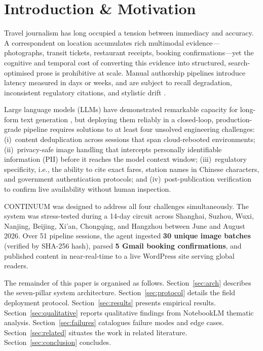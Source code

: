 \documentclass[conference]{IEEEtran}
\begin{document}
\section{Introduction \& Motivation}

Travel journalism has long occupied a tension between immediacy and accuracy.
A correspondent on location accumulates rich multimodal evidence---photographs,
transit tickets, restaurant receipts, booking confirmations---yet the cognitive
and temporal cost of converting this evidence into structured, search-optimised
prose is prohibitive at scale. Manual authorship pipelines introduce latency
measured in days or weeks, and are subject to recall degradation, inconsistent
regulatory citations, and stylistic drift \cite{Radford2019}.

Large language models (LLMs) have demonstrated remarkable capacity for long-form
text generation \cite{Brown2020}, but deploying them reliably in a closed-loop,
production-grade pipeline requires solutions to at least four unsolved engineering
challenges: (i)~content deduplication across sessions that span cloud-rebooted
environments; (ii)~privacy-safe image handling that intercepts personally
identifiable information (PII) before it reaches the model context window;
(iii)~regulatory specificity, i.e., the ability to cite exact fares, station
names in Chinese characters, and government authentication protocols; and
(iv)~post-publication verification to confirm live availability without
human inspection.

\textsc{CONTINUUM} was designed to address all four challenges simultaneously.
The system was stress-tested during a 14-day circuit across Shanghai,
Suzhou, Wuxi, Nanjing, Beijing, Xi'an, Chongqing, and Hangzhou between
June and August 2026. Over 51 pipeline sessions, the agent ingested
\textbf{30 unique image batches} (verified by SHA-256 hash), parsed
\textbf{5 Gmail booking confirmations}, and published content in near-real-time
to a live WordPress site serving global readers.

The remainder of this paper is organised as follows. Section~\ref{sec:arch}
describes the seven-pillar system architecture. Section~\ref{sec:protocol}
details the field deployment protocol. Section~\ref{sec:results} presents
empirical results. Section~\ref{sec:qualitative} reports qualitative findings
from NotebookLM thematic analysis. Section~\ref{sec:failures} catalogues
failure modes and edge cases. Section~\ref{sec:related} situates the work in
related literature. Section~\ref{sec:conclusion} concludes.
\end{document}
